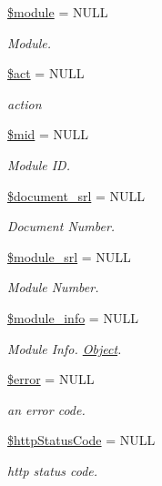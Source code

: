 \begin{DoxyCompactItemize}
\item 
\hyperlink{classModuleHandler_a24f28ac6c101582f043bef672a9f3b00}{\$module} = N\+U\+LL
\begin{DoxyCompactList}\small\item\em Module. \end{DoxyCompactList}\item 
\hyperlink{classModuleHandler_ae332c92a6ad1e9e823281d708088a0ff}{\$act} = N\+U\+LL
\begin{DoxyCompactList}\small\item\em action \end{DoxyCompactList}\item 
\hyperlink{classModuleHandler_a6bb7e9e29c0fb9893d051179281b093e}{\$mid} = N\+U\+LL
\begin{DoxyCompactList}\small\item\em Module ID. \end{DoxyCompactList}\item 
\hyperlink{classModuleHandler_acf9f6062042025aab6a7e10f6b261909}{\$document\+\_\+srl} = N\+U\+LL
\begin{DoxyCompactList}\small\item\em Document Number. \end{DoxyCompactList}\item 
\hyperlink{classModuleHandler_ad79751537e64d7bfc7dc6fa4280043b0}{\$module\+\_\+srl} = N\+U\+LL
\begin{DoxyCompactList}\small\item\em Module Number. \end{DoxyCompactList}\item 
\hyperlink{classModuleHandler_a2388e5ef665a5a82efa00c8c894df33c}{\$module\+\_\+info} = N\+U\+LL
\begin{DoxyCompactList}\small\item\em Module Info. \hyperlink{classObject}{Object}. \end{DoxyCompactList}\item 
\hyperlink{classModuleHandler_ad81b78f21e42724e73da6808c561159c}{\$error} = N\+U\+LL
\begin{DoxyCompactList}\small\item\em an error code. \end{DoxyCompactList}\item 
\hyperlink{classModuleHandler_a033e864206ca6a6494af015baa5d2365}{\$http\+Status\+Code} = N\+U\+LL
\begin{DoxyCompactList}\small\item\em http status code. \end{DoxyCompactList}\end{DoxyCompactItemize}


